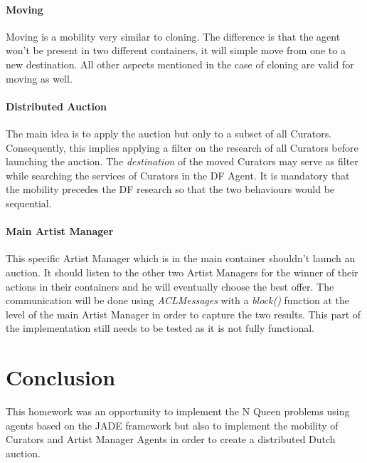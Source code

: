 \documentclass[a4paper,11pt]{article}
\begin{document}
  \paragraph{Moving}

  Moving is a mobility very similar to cloning. The difference is that the agent won't be present in
  two different containers, it will simple move from one to a new destination. All other aspects mentioned
  in the case of cloning are valid for moving as well.

  \paragraph{Distributed Auction}

  The main idea is to apply the auction but only to a subset of all Curators. Consequently, this implies
  applying a filter on the research of all Curators before launching the auction. The \textit{destination}
  of the moved Curators may serve as filter while searching the services of Curators in the DF Agent. It is
  mandatory that the mobility precedes the DF research so that the two behaviours would be sequential.

  \paragraph{Main Artist Manager}
  This specific Artist Manager which is in the main container shouldn't launch an auction. It should listen
  to the other two Artist Managers for the winner of their actions in their containers and he will eventually
  choose the best offer. The communication will be done using \textit{ACLMessages} with a \textit{block()}
  function at the level of the main Artist Manager in order to capture the two results. This part
  of the implementation still needs to be tested as it is not fully functional.

  \section{Conclusion}
  
  This homework was an opportunity to implement the N Queen problems using agents based on the JADE framework
  but also to implement the mobility of Curators and Artist Manager Agents in order to create a distributed
  Dutch auction.
\end{document}
